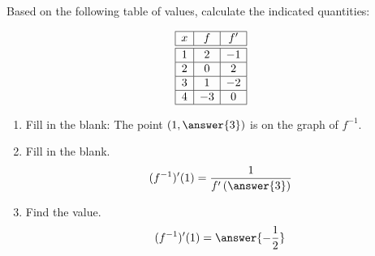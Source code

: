 \documentclass{ximera}
\author{Steven Gubkin\and Nela Lakos}
\begin{document}
\begin{exercise}

Based on the following table of values, calculate the indicated quantities:

 \[
  \begin{array}{|c|c|c|}\hline
    x & f  & f' \\ \hline \hline
    1 & 2 & -1 \\ \hline
    2 & 0  & 2  \\ \hline
    3 & 1  & -2 \\ \hline
    4 & -3 & 0  \\ \hline
  \end{array}
  \]
\begin{enumerate}
\item Fill in the blank: The point $(1, \answer{3})$ is on the graph of $f^{-1}$.


\item Fill in the blank.
\[
(f^{-1})'(1) = \frac{1}{f'\left(\answer{3}\right)}
\]

\item Find the value.
\[
(f^{-1})'(1) = \answer{-\frac{1}{2}}
\]
\end{enumerate}
\end{exercise}
\end{document}
